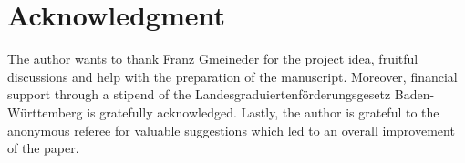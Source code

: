 \documentclass[a4paper,11pt]{amsart}
\numberwithin{equation}{section}
\begin{document}
	\section*{Acknowledgment}
	{The author wants to thank Franz Gmeineder for the project idea, fruitful discussions and help with the preparation of the manuscript. Moreover, financial support through a stipend of the Landesgraduiertenf\"{o}rderungsgesetz Baden-W\"{u}rttemberg is gratefully acknowledged. Lastly, the author is grateful to the anonymous referee for valuable suggestions which led to an overall improvement of the paper. } 
	
	
	
\end{document}
